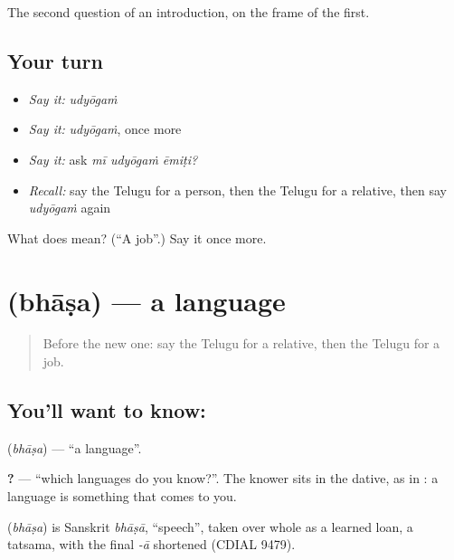 \begin{grammarlens}[title={What you've built}]
The second question of an introduction, on the frame of the first.
\end{grammarlens}

\subsection*{Your turn}
\begin{itemize}
\raggedright
  \item \emph{Say it:} \emph{udyōgaṁ}
  \item \emph{Say it:} \emph{udyōgaṁ}, once more
  \item \emph{Say it:} ask \emph{mī udyōgaṁ ēmiṭi?}
  \item \emph{Recall:} say the Telugu for a person, then the Telugu for a relative, then say \emph{udyōgaṁ} again
\end{itemize}

\begin{tcolorbox}[breakable,colback=teal!4,colframe=teal!35!black,title={Before you move on}]
What does  mean? (\textquotedblleft{}A job\textquotedblright{}.) Say it once more.
\end{tcolorbox}
\section[\texorpdfstring{\te{భాష} (bhāṣa)}{భాష (bhāṣa)}]{ (bhāṣa) — a language}

\label{lesson:TE-C89-language}



\begin{quote}
Before the new one: say the Telugu for a relative, then the Telugu for a job.
\end{quote}

\subsection*{You'll want to know: }
\textbf{} (\emph{bhāṣa}) — \textquotedblleft{}a language\textquotedblright{}.

\textbf{   ?} — \textquotedblleft{}which languages do you know?\textquotedblright{}. The knower sits in the dative, as in \textbf{  }: a language is something that comes to you.

\begin{cousinweb}
\textbf{} (\emph{bhāṣa}) is Sanskrit \emph{bhāṣā}, \textquotedblleft{}speech\textquotedblright{}, taken over whole as a learned loan, a tatsama, with the final \emph{-ā} shortened (CDIAL 9479).
\end{cousinweb}

